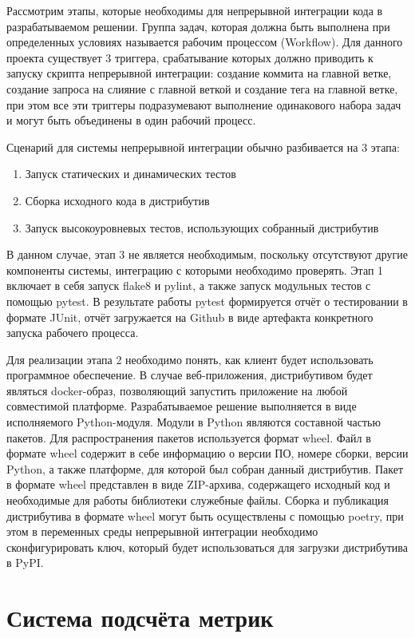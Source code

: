 Рассмотрим этапы, которые необходимы для непрерывной интеграции кода в
разрабатываемом решении. Группа задач, которая должна быть выполнена при
определенных условиях называется рабочим процессом (Workflow). Для данного
проекта существует 3 триггера, срабатывание которых должно приводить к запуску
скрипта непрерывной интеграции: создание коммита на главной ветке, создание
запроса на слияние с главной веткой и создание тега на главной ветке, при этом
все эти триггеры подразумевают выполнение одинакового набора задач и могут быть
объединены в один рабочий процесс.

Сценарий для системы непрерывной интеграции обычно разбивается на 3 этапа:

\begin{enumerate}
    \item Запуск статических и динамических тестов
    \item Сборка исходного кода в дистрибутив
    \item Запуск высокоуровневых тестов, использующих собранный дистрибутив
\end{enumerate}

В данном случае, этап 3 не является необходимым, поскольку отсутствуют другие
компоненты системы, интеграцию с которыми необходимо проверять. Этап 1 включает
в себя запуск flake8 и pylint, а также запуск модульных тестов с помощью pytest.
В результате работы pytest формируется отчёт о тестировании в формате JUnit,
отчёт загружается на Github в виде артефакта конкретного запуска рабочего
процесса.

Для реализации этапа 2 необходимо понять, как клиент будет использовать
программное обеспечение. В случае веб-приложения, дистрибутивом будет являться
docker-образ, позволяющий запустить приложение на любой совместимой платформе.
Разрабатываемое решение выполняется в виде исполняемого Python-модуля. Модули в
Python являются составной частью пакетов. Для распространения пакетов
используется формат wheel. Файл в формате wheel содержит в себе информацию о
версии ПО, номере сборки, версии Python, а также платформе, для которой был
собран данный дистрибутив. Пакет в формате wheel представлен в виде ZIP-архива,
содержащего исходный код и необходимые для работы библиотеки служебные файлы.
Сборка и публикация дистрибутива в формате wheel могут быть осуществлены с
помощью poetry, при этом в переменных среды непрерывной интеграции необходимо
сконфигурировать ключ, который будет использоваться для загрузки дистрибутива в
PyPI.


\newpage
\chapter{Система подсчёта метрик}


